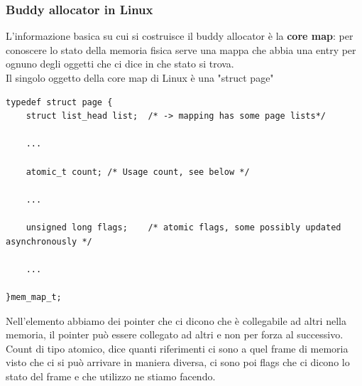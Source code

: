 \documentclass[12pt, oneside]{extbook}
\begin{document}
\subsubsection{Buddy allocator in Linux}
L'informazione basica su cui si costruisce il buddy allocator è la \textbf{core map}: per conoscere lo stato della memoria fisica serve una mappa che abbia una entry per ognuno degli oggetti che ci dice in che stato si trova.\\ Il singolo oggetto della core map di Linux è una "struct page"
\begin{lstlisting}
typedef struct page {
	struct list_head list;	/* -> mapping has some page lists*/
	
	...
	
	atomic_t count;	/* Usage count, see below */
	
	...
	
	unsigned long flags;	/* atomic flags, some possibly updated asynchronously */
	
	...
	
}mem_map_t;
\end{lstlisting}
Nell'elemento abbiamo dei pointer che ci dicono che è collegabile ad altri nella memoria, il pointer può essere collegato ad altri e non per forza al successivo. Count di tipo atomico, dice quanti riferimenti ci sono a quel frame di memoria visto che ci si può arrivare in maniera diversa, ci sono poi flags che ci dicono lo stato del frame e che utilizzo ne stiamo facendo.
\end{document}

